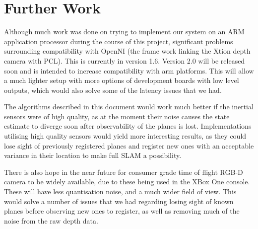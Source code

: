 \documentclass[]{article}
\begin{document}
{\section{Further Work}
Although much work was done on trying to implement our system on an ARM application processor during the course of this project, significant problems surrounding compatibility with OpenNI (the frame work linking the Xtion depth camera with PCL). This is currently in version 1.6. Version 2.0 will be released soon and is intended to increase compatibility with arm platforms. This will allow a much lighter setup with more options of development boards with low level outputs, which would also solve some of the latency issues that we had. 

The algorithms described in this document would work much better if the inertial sensors were of high quality, as at the moment their noise causes the state estimate to diverge soon after observability of the planes is lost. Implementations utilising high quality sensors would yield more interesting results, as they could lose sight of previously registered planes and register new ones with an acceptable variance in their location to make full SLAM a possibility. 

There is also hope in the near future for consumer grade time of flight RGB-D camera to be widely available, due to these being used in the XBox One console. These will have less quantisation noise, and a much wider field of view. This would solve a number of issues that we had regarding losing sight of known planes before observing new ones to register, as well as removing much of the noise from the raw depth data. 




\clearpage

\nocite{*}

\printbibliography
% 




}
\end{document}
